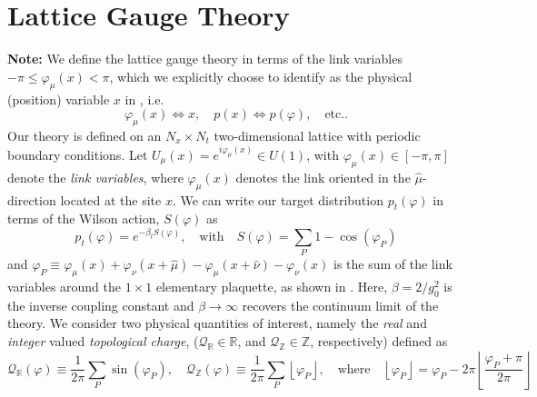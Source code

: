 \documentclass{article} %
\begin{document}
\section{\label{sec:lattice_gauge_theory}Lattice Gauge Theory}
%
\textbf{Note:} We define the lattice gauge theory in terms of the link variables \(-\pi \leq \varphi_{\mu}(x) < \pi\),
which we explicitly choose to identify as the physical (position) variable \(x\) in , i.e.\ 
\begin{equation}
   \varphi_{\mu}(x)\Longleftrightarrow x, \quad p(x)\Longleftrightarrow p(\varphi),\quad \text{etc.}.
\end{equation}
%
Our theory is defined on an \(N_{x}\times N_{t}\) two-dimensional lattice with periodic boundary conditions.
%
Let \(U_{\mu}(x) = e^{i\varphi_{\mu}(x)} \in U(1)\), with \(\varphi_{\mu}(x) \in [-\pi,\pi]\) denote the \emph{link
variables}, where \(\varphi_{\mu}(x)\) denotes the link oriented in the \(\hat{\mu}\)-direction located at the site
\(x\).
%
%
We can write our target distribution \(p_{t}(\varphi)\) in terms of the Wilson action, \(S(\varphi)\) as
%
\begin{equation}
   p_{t}(\varphi) = e^{-\beta_{t}S(\varphi)},\quad\text{with}\quad S(\varphi) = \sum_{P}1 - \cos(\varphi_{P})
\end{equation}
%
and \(\varphi_{P} \equiv \varphi_{\mu}(x) + \varphi_{\nu}(x+\hat{\mu}) - \varphi_{\mu}(x+\hat{\nu})
-\varphi_{\nu}(x)\) is the sum of the link variables around the \(1\times1\) elementary plaquette, as shown in
\Figref{fig:plaquette}.
%
Here, \(\beta = 2 / g_{0}^{2}\) is the inverse coupling constant and \(\beta\rightarrow\infty\) recovers the continuum
limit of the theory. 
%
We consider two physical quantities of interest, namely the \emph{real} and \emph{integer} valued \emph{topological
charge}, (\(\mathcal{Q}_{\mathbb{R}} \in \mathbb{R}\), and \(\mathcal{Q}_{\mathbb{Z}}\in\mathbb{Z}\), respectively)
defined as
%
\begin{equation*}
   \mathcal{Q}_{\mathbb{R}}(\varphi) 
   \equiv \frac{1}{2\pi}\sum_{P}\sin(\varphi_{P}),\quad%
      \mathcal{Q}_{\mathbb{Z}}(\varphi) \equiv \frac{1}{2\pi}\sum_{P}\left\lfloor\varphi_{P}\right\rfloor,
   \quad\text{where}\quad \left\lfloor\varphi_{P}\right\rfloor = \varphi_{P} -
   2\pi\left\lfloor\frac{\varphi_{P}+\pi}{2\pi}\right\rfloor
\end{equation*}
\end{document}
